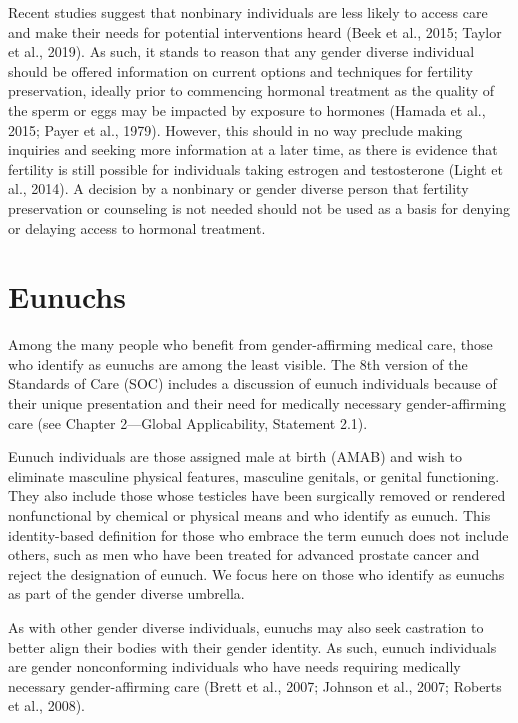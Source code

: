 \documentclass[
]{book}
\begin{document}
Recent studies suggest that nonbinary individuals are less likely to access care and make their
needs for potential interventions heard (Beek
et al., 2015; Taylor et al., 2019). As such, it stands
to reason that any gender diverse individual
should be offered information on current options
and techniques for fertility preservation, ideally
prior to commencing hormonal treatment as the
quality of the sperm or eggs may be impacted
by exposure to hormones (Hamada et al., 2015;
Payer et al., 1979). However, this should in no
way preclude making inquiries and seeking more
information at a later time, as there is evidence
that fertility is still possible for individuals taking
estrogen and testosterone (Light et al., 2014). A
decision by a nonbinary or gender diverse person
that fertility preservation or counseling is not
needed should not be used as a basis for denying
or delaying access to hormonal treatment.

\hypertarget{eunuchs}{%
\chapter{Eunuchs}\label{eunuchs}}

Among the many people who benefit from
gender-affirming medical care, those who identify
as eunuchs are among the least visible. The 8th
version of the Standards of Care (SOC) includes
a discussion of eunuch individuals because of
their unique presentation and their need for medically necessary gender-affirming care (see
Chapter 2---Global Applicability, Statement 2.1).

Eunuch individuals are those assigned male at
birth (AMAB) and wish to eliminate masculine
physical features, masculine genitals, or genital
functioning. They also include those whose testicles have been surgically removed or rendered
nonfunctional by chemical or physical means and
who identify as eunuch. This identity-based definition for those who embrace the term eunuch
does not include others, such as men who have
been treated for advanced prostate cancer and
reject the designation of eunuch. We focus here
on those who identify as eunuchs as part of the
gender diverse umbrella.

As with other gender diverse individuals,
eunuchs may also seek castration to better align
their bodies with their gender identity. As such,
eunuch individuals are gender nonconforming
individuals who have needs requiring medically
necessary gender-affirming care (Brett et al.,
2007; Johnson et al., 2007; Roberts et al., 2008).
\end{document}
